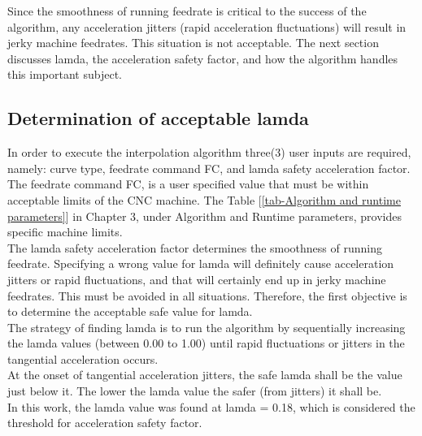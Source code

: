 Since the smoothness of running feedrate is critical to the success of the algorithm, any acceleration jitters (rapid acceleration fluctuations) will result in jerky machine feedrates. This situation is not acceptable. The next section discusses lamda, the acceleration safety factor, and how the algorithm handles this important subject. 



\subsection{Determination of acceptable lamda}
\label{chap4-Determination of acceptablel lamda}

In order to execute the interpolation algorithm three(3) user inputs are required, namely: curve type, feedrate command FC, and lamda safety acceleration factor.\\

The feedrate command FC, is a user specified value that must be within acceptable limits of the CNC machine. The Table [\ref{tab-Algorithm and runtime parameters}] in Chapter 3, under Algorithm and Runtime parameters, provides specific machine limits.\\

The lamda safety acceleration factor determines the smoothness of running feedrate. Specifying a wrong value for lamda will definitely cause acceleration jitters or rapid fluctuations, and that will certainly end up in jerky machine feedrates. This must be avoided in all situations. Therefore, the first objective is to determine the acceptable safe value for lamda.\\

The strategy of finding lamda is to run the algorithm by sequentially increasing the lamda values (between 0.00 to 1.00) until rapid fluctuations or jitters in the tangential acceleration occurs. \\

At the onset of tangential acceleration jitters, the safe lamda shall be the value just below it. The lower the lamda value the safer (from jitters) it shall be. \\

In this work, the lamda value was found at lamda = 0.18, which is considered the threshold for acceleration safety factor. \\

